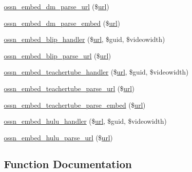 \begin{DoxyCompactItemize}
\item 
\hyperlink{ossnembed_8lib_8php_a8b3d523ebfd5ad3b39a6f941e2a22a34}{ossn\+\_\+embed\+\_\+dm\+\_\+parse\+\_\+url} (\$\hyperlink{ossn_8config_8site_8example_8php_ad643c3db2725019ef8130393d549e6db}{url})
\item 
\hyperlink{ossnembed_8lib_8php_ad4fc081364fdd01ba5925db6d897b587}{ossn\+\_\+embed\+\_\+dm\+\_\+parse\+\_\+embed} (\$\hyperlink{ossn_8config_8site_8example_8php_ad643c3db2725019ef8130393d549e6db}{url})
\item 
\hyperlink{ossnembed_8lib_8php_afd45ca6f1df18012d4515a4908e02a99}{ossn\+\_\+embed\+\_\+blip\+\_\+handler} (\$\hyperlink{ossn_8config_8site_8example_8php_ad643c3db2725019ef8130393d549e6db}{url}, \$guid, \$videowidth)
\item 
\hyperlink{ossnembed_8lib_8php_a31624c15720330147abf8e24f511144d}{ossn\+\_\+embed\+\_\+blip\+\_\+parse\+\_\+url} (\$\hyperlink{ossn_8config_8site_8example_8php_ad643c3db2725019ef8130393d549e6db}{url})
\item 
\hyperlink{ossnembed_8lib_8php_a1a6c330a51d75bc0a69af8ac09afa8e2}{ossn\+\_\+embed\+\_\+teachertube\+\_\+handler} (\$\hyperlink{ossn_8config_8site_8example_8php_ad643c3db2725019ef8130393d549e6db}{url}, \$guid, \$videowidth)
\item 
\hyperlink{ossnembed_8lib_8php_a62914a89180f090cb43ec7aa6fa564ff}{ossn\+\_\+embed\+\_\+teachertube\+\_\+parse\+\_\+url} (\$\hyperlink{ossn_8config_8site_8example_8php_ad643c3db2725019ef8130393d549e6db}{url})
\item 
\hyperlink{ossnembed_8lib_8php_a48b33ab883957000880380ae10e7e7b0}{ossn\+\_\+embed\+\_\+teachertube\+\_\+parse\+\_\+embed} (\$\hyperlink{ossn_8config_8site_8example_8php_ad643c3db2725019ef8130393d549e6db}{url})
\item 
\hyperlink{ossnembed_8lib_8php_a3a403b7a932a6ccea5dbad2e7dbbcd0b}{ossn\+\_\+embed\+\_\+hulu\+\_\+handler} (\$\hyperlink{ossn_8config_8site_8example_8php_ad643c3db2725019ef8130393d549e6db}{url}, \$guid, \$videowidth)
\item 
\hyperlink{ossnembed_8lib_8php_ada003333d051677c89adf64c608e79bb}{ossn\+\_\+embed\+\_\+hulu\+\_\+parse\+\_\+url} (\$\hyperlink{ossn_8config_8site_8example_8php_ad643c3db2725019ef8130393d549e6db}{url})
\end{DoxyCompactItemize}


\subsection{Function Documentation}
